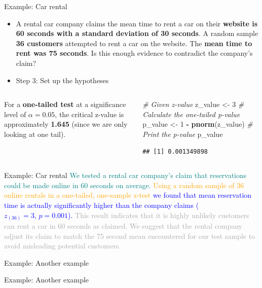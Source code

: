 \documentclass[
  ignorenonframetext,
]{beamer}
\newenvironment{Shaded}{\begin{snugshade}}{\end{snugshade}}
\newcommand{\CommentTok}[1]{\textcolor[rgb]{0.56,0.35,0.01}{\textit{#1}}}
\newcommand{\DecValTok}[1]{\textcolor[rgb]{0.00,0.00,0.81}{#1}}
\newcommand{\FunctionTok}[1]{\textcolor[rgb]{0.13,0.29,0.53}{\textbf{#1}}}
\newcommand{\NormalTok}[1]{#1}
\newcommand{\OtherTok}[1]{\textcolor[rgb]{0.56,0.35,0.01}{#1}}
\newcommand{\SpecialCharTok}[1]{\textcolor[rgb]{0.81,0.36,0.00}{\textbf{#1}}}
\begin{document}
\begin{frame}[fragile]{Example: Car rental}
\label{example-car-rental-4}
\begin{itemize}
\item
  A rental car company claims the mean time to rent a car on their
  \textbf{website is 60 seconds with a standard deviation of 30
  seconds}. A random sample \textbf{36 customers} attempted to rent a
  car on the website. The \textbf{mean time to rent was 75 seconds}. Is
  this enough evidence to contradict the company's claim? \vspace{0.5cm}
\item
  Step 3: Set up the hypotheses
\end{itemize}

\begin{columns}[T]
\begin{column}{0.4\textwidth}
For a \textbf{one-tailed test} at a significance level of
\textbf{\(\alpha = 0.05\)}, the critical z-value is approximately
\textbf{1.645} (since we are only looking at one tail).
\end{column}

\begin{column}{0.6\textwidth}
\begin{Shaded}
\begin{Highlighting}[]
\CommentTok{\# Given z{-}value}
\NormalTok{z\_value }\OtherTok{\textless{}{-}} \DecValTok{3}
\CommentTok{\# Calculate the one{-}tailed p{-}value}
\NormalTok{p\_value }\OtherTok{\textless{}{-}} \DecValTok{1} \SpecialCharTok{{-}} \FunctionTok{pnorm}\NormalTok{(z\_value)}
\CommentTok{\# Print the p{-}value}
\NormalTok{p\_value}
\end{Highlighting}
\end{Shaded}

\begin{verbatim}
## [1] 0.001349898
\end{verbatim}
\end{column}
\end{columns}
\end{frame}

\begin{frame}{Example: Car rental}
\label{example-car-rental-5}
\textcolor{teal}{We tested a rental car company's claim that reservations could be made online in 60 seconds on average.}
\textcolor{orange}{ Using a random sample of 36 online rentals in a one-tailed, one-sample z-test}
\textcolor{blue}{ we found that mean reservation time is actually significantly higher than the company claims (\( z_{(36)}=3, \, p=0.001 \)).}
\textcolor{darkgray}{  This result indicates that it is highly unlikely customers can rent a car in 60 seconds as claimed.  We suggest that the rental company adjust its claim to match the 75 second mean encountered for our test sample to avoid misleading potential customers.}
\end{frame}

\begin{frame}{Example: Another example}
\label{example-another-example}
\end{frame}

\begin{frame}{Example: Another example}
\label{example-another-example-1}
\end{frame}

\begin{frame}
\end{frame}
\end{document}
